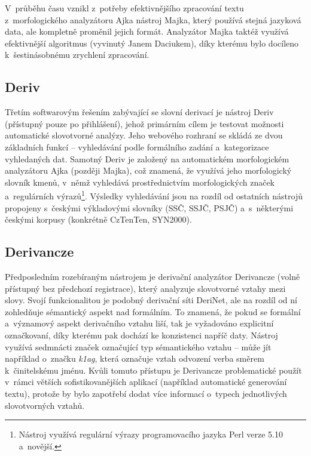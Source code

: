 V~průběhu času vznikl z~potřeby efektivnějšího zpracování textu
z~morfologického analyzátoru Ajka nástroj Majka, který používá stejná
jazyková data, ale kompletně proměnil jejich formát. Analyzátor Majka
taktéž využívá efektivnější algoritmus (vyvinutý Janem Daciukem), díky
kterému bylo docíleno k~šestinásobnému zrychlení zpracování.
\parencite{majka}

\hypertarget{deriv}{%
\subsection{Deriv}\label{deriv}}

Třetím softwarovým řešením zabývající se slovní derivací je nástroj
Deriv (přístupný pouze po přihlášení), jehož primárním cílem je testovat
možnosti automatické slovotvorné analýzy. Jeho webového rozhraní se
skládá ze dvou základních funkcí -- vyhledávání podle formálního zadání
a~kategorizace vyhledaných dat. Samotný Deriv je založený na
automatickém morfologickém analyzátoru Ajka (později Majka), což
znamená, že využívá jeho morfologický slovník kmenů, v~němž vyhledává
prostřednictvím morfologických značek a~regulárních
výrazů\footnote{Nástroj využívá regulární výrazy programovacího jazyka Perl verze 5.10 a~novější.}.
Výsledky vyhledávání jsou na rozdíl od ostatních nástrojů propojeny
s~českými výkladovými slovníky (SSČ, SSJČ, PSJČ) a~s~některými českými
korpusy (konkrétně CzTenTen, SYN2000). \parencite{deriv}

\hypertarget{derivancze}{%
\subsection{Derivancze}\label{derivancze}}

Předposledním rozebíraným nástrojem je derivační analyzátor Derivancze
(volně přístupný bez předchozí registrace), který analyzuje slovotvorné
vztahy mezi slovy. Svojí funkcionalitou je podobný derivační síti
DeriNet, ale na rozdíl od ní zohledňuje sémantický aspekt nad formálním.
To znamená, že pokud se formální a~významový aspekt derivačního vztahu
liší, tak je vyžadováno explicitní označkovaní, díky kterému pak dochází
ke konzistenci napříč daty. Nástroj využívá sedmnácti značek označující
typ sémantického vztahu -- může jít například o~značku \emph{k1ag},
která označuje vztah odvození verba směrem k~činitelskému jménu. Kvůli
tomuto přístupu je Derivancze problematické použít v~rámci větších
sofistikovanějších aplikací (například automatické generování textu),
protože by bylo zapotřebí dodat více informací o~typech jednotlivých
slovotvorných vztahů. \parencite{derivancze}

